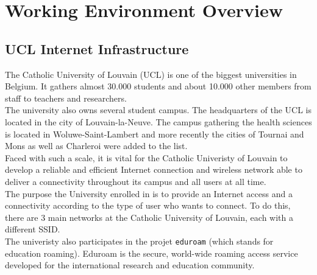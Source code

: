 
\chapter{Working Environment Overview} %

\label{Chapter2} %



\section{UCL Internet Infrastructure}
The Catholic University of Louvain (UCL) is one of the biggest universities in Belgium. It gathers almost 30.000 students and about 10.000 other members from staff to teachers and researchers.\\

The university also owns several student campus. The headquarters of the UCL is located in the city of Louvain-la-Neuve. The campus gathering the health sciences is located in Woluwe-Saint-Lambert and more recently the cities of Tournai and Mons as well as Charleroi were added to the list.\\

Faced with such a scale, it is vital for the Catholic Univeristy of Louvain to develop a reliable and efficient Internet connection and wireless network able to deliver a connectivity throughout its campus and all users at all time.\\

The purpose the University enrolled in is to provide an Internet access and a connectivity according to the type of user who wants to connect. To do this, there are 3 main networks at the Catholic University of Louvain, each with a different SSID.\\

The univeristy also participates in the projet \texttt{eduroam} (which stands for education roaming). Eduroam is the secure, world-wide roaming access service developed for the international research and education community\cite{eduroam1}.\\

